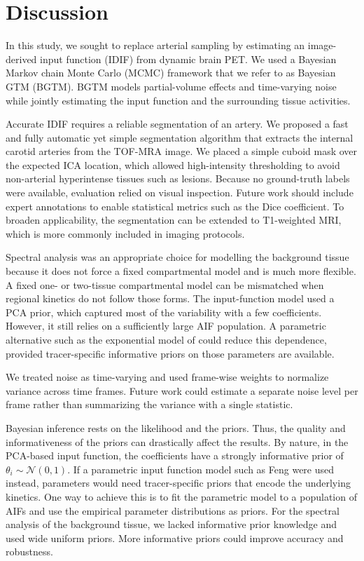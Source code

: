 \chapter{Discussion}

In this study, we sought to replace arterial sampling by estimating an image-derived input function (IDIF) from dynamic brain PET.
We used a Bayesian Markov chain Monte Carlo (MCMC) framework that we refer to as Bayesian GTM (BGTM).
BGTM models partial-volume effects and time-varying noise while jointly estimating the input function and the surrounding tissue activities.

Accurate IDIF requires a reliable segmentation of an artery.
We proposed a fast and fully automatic yet simple segmentation algorithm that extracts the internal carotid arteries from the TOF-MRA image.
We placed a simple cuboid mask over the expected ICA location, which allowed high-intensity thresholding to avoid non-arterial hyperintense tissues such as lesions.
Because no ground-truth labels were available, evaluation relied on visual inspection. Future work should include expert annotations to enable statistical metrics such as the Dice coefficient.
To broaden applicability, the segmentation can be extended to T1-weighted MRI, which is more commonly included in imaging protocols.

Spectral analysis was an appropriate choice for modelling the background tissue because it does not force a fixed compartmental model and is much more flexible.
A fixed one- or two-tissue compartmental model can be mismatched when regional kinetics do not follow those forms.
The input-function model used a PCA prior, which captured most of the variability with a few coefficients.
However, it still relies on a sufficiently large AIF population.
A parametric alternative such as the exponential model of \citeauthor{feng1993models} \cite{feng1993models} could reduce this dependence, provided tracer-specific informative priors on those parameters are available.

We treated noise as time-varying and used frame-wise weights to normalize variance across time frames.
Future work could estimate a separate noise level per frame rather than summarizing the variance with a single statistic.

Bayesian inference rests on the likelihood and the priors.
Thus, the quality and informativeness of the priors can drastically affect the results.
By nature, in the PCA-based input function, the coefficients have a strongly informative prior of \(\theta_i \sim \mathcal{N}(0,1)\).
If a parametric input function model such as Feng were used instead, parameters would need tracer-specific priors that encode the underlying kinetics.
One way to achieve this is to fit the parametric model to a population of AIFs and use the empirical parameter distributions as priors.
For the spectral analysis of the background tissue, we lacked informative prior knowledge and used wide uniform priors.
More informative priors could improve accuracy and robustness.

